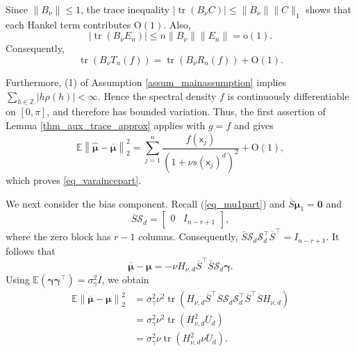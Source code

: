 \documentclass[11pt]{article}
\newcommand{\sfx}{\mathsf{x}}
\numberwithin{equation}{section}
\numberwithin{figure}{section}
\begin{document}
Since \(\|B_\nu\|\leq1\), the trace inequality
\(\left|\operatorname{tr}(B_\nu C)\right|\leq\|B_\nu\|\|C\|_1\)
shows that each Hankel term contributes \(\mathrm{O}(1)\). Also,
\[
\left|\operatorname{tr}(B_\nu E_n)\right|
\leq
n\|B_\nu\|\|E_n\|
=
\mathrm{o}(1).
\]
Consequently,
\[
\operatorname{tr}\!\left(B_\nu T_n(f)\right)
=
\operatorname{tr}\!\left(B_\nu R_n(f)\right)
+
\mathrm{O}(1).
\]

Furthermore, (1) of Assumption \ref{assum_mainassumption} implies
\(\sum_{h\in\mathbb{Z}}|h\rho(h)|<\infty\). Hence the spectral density \(f\) is continuously differentiable on \([0,\pi]\), and therefore has bounded variation. Thus, the first assertion of Lemma \ref{thm_aux_trace_approx} applies with \(g=f\) and gives
\begin{equation*}
\mathbb{E}\left\|
\widehat{\bm{\mu}}-\overline{\bm{\mu}}
\right\|_2^2
=
\sum_{j=1}^{n}
\frac{f(\sfx_j)}
{(1+\nu s(\sfx_j)^d)^{2}}
+
\mathrm{O}(1),
\end{equation*}
which proves \eqref{eq_varaincepart}.

We next consider the bias component. Recall (\ref{eq_mu1part}) and \(\overline S\bm{\mu}_1=\bm{0}\) and
\begin{equation*}
\overline S\mathcal S_d=
\begin{bmatrix}
0 & I_{n-r+1}
\end{bmatrix},
\end{equation*}
where the zero block has \(r-1\) columns. Consequently,
\(\overline S\mathcal S_d\mathcal S_d^\top\overline S^\top=I_{n-r+1}\). It follows that
\begin{equation*}
\overline{\bm{\mu}}-\bm{\mu}
=
-\nu H_{\nu,d}\overline S^\top\overline S\mathcal S_d\bm{\gamma}.
\end{equation*}
Using \(\mathbb{E}(\bm{\gamma}\bm{\gamma}^\top)=\sigma_\gamma^2 I\), we obtain
\begin{align*}
\mathbb{E}\left\|
\overline{\bm{\mu}}-\bm{\mu}
\right\|_2^2
&=
\sigma_\gamma^2\nu^2
\operatorname{tr}\!\left(
H_{\nu,d}
\overline S^\top\overline S
\mathcal S_d\mathcal S_d^\top
\overline S^\top\overline S
H_{\nu,d}
\right) \\
&=
\sigma_\gamma^2\nu^2
\operatorname{tr}\!\left(
H_{\nu,d}^2\overline U_d
\right) \\
&=
\sigma_\gamma^2\nu
\operatorname{tr}\!\left(
H_{\nu,d}^2\nu\overline U_d
\right).
\end{align*}
\end{document}
